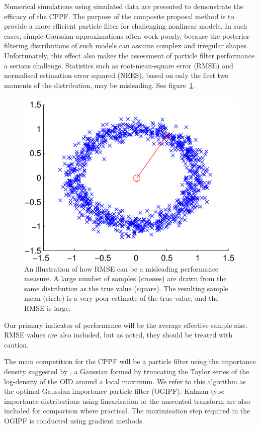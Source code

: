 \documentclass{article}
\begin{document}
Numerical simulations using simulated data are presented to demonstrate the efficacy of the CPPF. The purpose of the composite proposal method is to provide a more efficient particle filter for challenging nonlinear models. In such cases, simple Gaussian approximations often work poorly, because the posterior filtering distributions of such models can assume complex and irregular shapes. Unfortunately, this effect also makes the assessment of particle filter performance a serious challenge. Statistics such as root-mean-square error (RMSE) and normalised estimation error squared (NEES), based on only the first two moments of the distribution, may be misleading. See figure~\ref{fig:rmse_fail}.
%
\begin{figure}
\centering
\includegraphics[width=0.7\columnwidth]{rmse_fail.pdf}
\caption{An illustration of how RMSE can be a misleading performance measure. A large number of samples (crosses) are drawn from the same distribution as the true value (square). The resulting sample mean (circle) is a very poor estimate of the true value, and the RMSE is large.}
\label{fig:rmse_fail}
\end{figure}

Our primary indicator of performance will be the average effective sample size. RMSE values are also included, but as noted, they should be treated with caution.

The main competition for the CPPF will be a particle filter using the importance density suggested by \citet{Doucet2000a}, a Gaussian formed by truncating the Taylor series of the log-density of the OID around a local maximum. We refer to this algorithm as the optimal Gaussian importance particle filter (OGIPF). Kalman-type importance distributions using linearisation or the unscented transform are also included for comparison where practical. The maximisation step required in the OGIPF is conducted using gradient methods.
\end{document}
